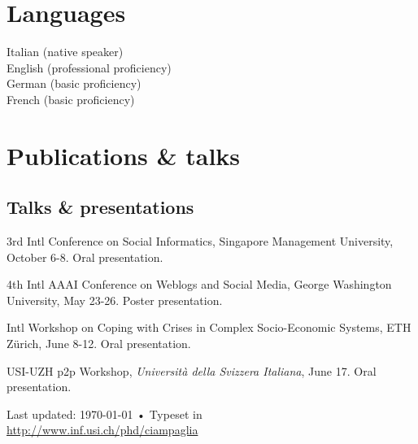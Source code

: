 \documentclass[10pt, letterpaper]{article}
\newcommand{\years}[1]{\marginnote{\small #1}}
\begin{document}
\section*{Languages}
Italian (native speaker)\\
English (professional proficiency)\\
German (basic proficiency)\\
French (basic proficiency)

\section*{Publications \& talks}

\printbibliography[heading=subbibliography,title=Journal papers,%
        type=article]
\printbibliography[heading=subbibliography,title=Conference proceedings, %
        type=inproceedings]
\printbibliography[heading=subbibliography,title=Theses \& miscellanea, %
        nottype=article, nottype=inproceedings]

\subsection*{Talks \& presentations}

\years{2012} 3rd Intl Conference on Social Informatics, Singapore
Management University, October 6-8. Oral presentation.

\years{2010} 4th Intl AAAI Conference on Weblogs
and Social Media, George Washington University, May 23-26. Poster presentation.

\years{2009} Intl Workshop on Coping with Crises in Complex
Socio-Economic Systems, ETH Z\"urich, June 8-12. Oral presentation.

\years{2009} USI-UZH p2p Workshop, \textsl{Università
della Svizzera Italiana}, June 17. Oral presentation.

\vfill{}

\begin{center}
{\scriptsize  Last updated: \today\- •\- 
Typeset in { \XeTeX}\\
\href{http://www.inf.usi.ch/phd/ciampaglia}{http://www.inf.usi.ch/phd/ciampaglia}}
\end{center}
\end{document}
